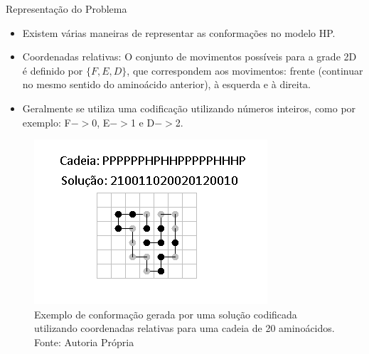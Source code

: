 \begin{frame}[allowframebreaks]{Representação do Problema}
	
	\begin{itemize}
		\item Existem várias maneiras de representar as conformações no modelo HP.
		\item 	Coordenadas relativas: O conjunto de movimentos possíveis para a grade 2D é definido por $\{F,E,D\}$, que correspondem aos movimentos: frente (continuar no mesmo sentido do aminoácido anterior), à esquerda e à direita. 
		\item Geralmente se utiliza uma codificação utilizando números inteiros, como por exemplo:  F$->$0, E$->$1 e D$->$2. 
	\end{itemize}
	
	\begin{figure}[!htb]
		\centering
		\includegraphics[scale=.8]{figuras/ExemploCodificacao.png}
		\caption{Exemplo de conformação gerada por uma solução codificada utilizando coordenadas relativas para uma cadeia de 20 aminoácidos.  Fonte: Autoria Própria }
		\label{fig:exemploCodificacao}
	\end{figure}



	
\end{frame}

	
